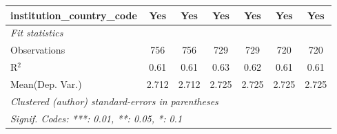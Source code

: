 \begin{tabular}{lcccccc}
   institution\_country\_code         & Yes     & Yes     & Yes    & Yes     & Yes    & Yes\\  
   \midrule
   \emph{Fit statistics}\\
   Observations                       & 756     & 756     & 729    & 729     & 720    & 720\\  
   R$^2$                              & 0.61    & 0.61    & 0.63   & 0.62    & 0.61   & 0.61\\  
Mean(Dep. Var.) & 2.712 & 2.712 & 2.725 & 2.725 & 2.725 & 2.725 \\
   \midrule \midrule
   \multicolumn{7}{l}{\emph{Clustered (author) standard-errors in parentheses}}\\
   \multicolumn{7}{l}{\emph{Signif. Codes: ***: 0.01, **: 0.05, *: 0.1}}\\
\end{tabular}
\par\endgroup
